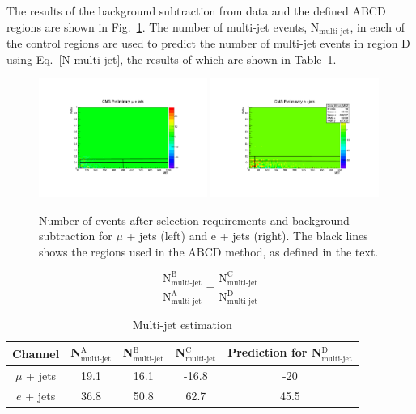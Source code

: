 The results of the background subtraction from data and the defined ABCD regions are shown in Fig.~\ref{fig:QCDplots}.
The number of multi-jet events, N$_{\textrm{multi-jet}}$, in each of the control regions are used to predict the number of multi-jet events in region D using Eq.~\ref{N-multi-jet}, the results of which are shown in Table~\ref{tab:multijet}.

\begin{figure}[!ht]
    \includegraphics[width=0.49\textwidth]{images/Run1/Data_Minus_MC_Mu_Lines2.pdf}
    \includegraphics[width=0.49\textwidth]{images/Run1/Data_Minus_MC_El_Lines2.pdf}
    \caption{Number of events after selection requirements and background subtraction for $\mu$ + jets (left) and e + jets (right). The black lines shows the regions used in the ABCD method, as defined in the text.}
    \label{fig:QCDplots}
\end{figure}


\begin{equation}
\frac{\textrm{N}^{\textrm{B}}_{\textrm{multi-jet}}}{\textrm{N}^{\textrm{A}}_{\textrm{multi-jet}}} = \frac{\textrm{N}^{\textrm{C}}_{\textrm{multi-jet}}}{\textrm{N}^{\textrm{D}}_{\textrm{multi-jet}}}
\label{N-multi-jet}
\end{equation}

\begin{table}[ht!]
\caption{Multi-jet estimation}
\centering
\begin{tabular}{|c |c |c |c |c |}
 \hline 
 Channel & N$^{\textrm{A}}_{\textrm{multi-jet}}$  & N$^{\textrm{B}}_{\textrm{multi-jet}}$ & N$^{\textrm{C}}_{\textrm{multi-jet}}$ & Prediction for N$^{\textrm{D}}_{\textrm{multi-jet}}$  \\
  \hline
$\mu$ + jets & 19.1 & 16.1 & -16.8 & -20  \\
 \hline
$e$ + jets & 36.8  & 50.8 & 62.7 &45.5  \\
\hline
\end{tabular}
\label{tab:multijet}
\end{table}


